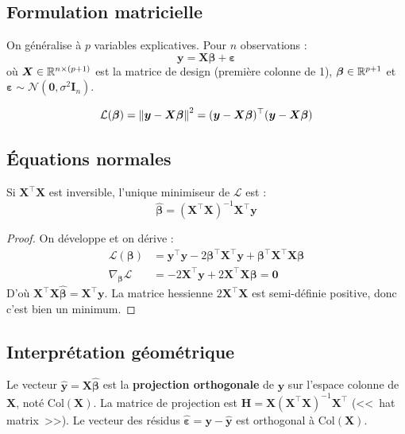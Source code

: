 \subsection{Formulation matricielle}

On g\'en\'eralise \`a $p$ variables explicatives. Pour $n$ observations :
\[
  \bm{y} = \bm{X}\bm{\beta} + \bm{\varepsilon}
\]
o\`u $\bm{X} \in \mathbb{R}^{n \times (p+1)}$ est la matrice de design (premi\`ere colonne de 1),
$\bm{\beta} \in \mathbb{R}^{p+1}$ et $\bm{\varepsilon} \sim \mathcal{N}(\bm{0}, \sigma^2 \bm{I}_n)$.

\begin{definition}
\[
  \mathcal{L}(\bm{\beta}) = \left\| \bm{y} - \bm{X}\bm{\beta} \right\|^2
  = (\bm{y} - \bm{X}\bm{\beta})^\top (\bm{y} - \bm{X}\bm{\beta})
\]
\end{definition}

\subsection{\'Equations normales}

\begin{theoreme}
\label{thm:normal-equations}
Si $\bm{X}^\top \bm{X}$ est inversible, l'unique minimiseur de $\mathcal{L}$ est :
\[
  \hat{\bm{\beta}} = (\bm{X}^\top \bm{X})^{-1} \bm{X}^\top \bm{y}
\]
\end{theoreme}

\begin{proof}
On d\'eveloppe et on d\'erive :
\begin{align*}
  \mathcal{L}(\bm{\beta})
  &= \bm{y}^\top \bm{y} - 2\bm{\beta}^\top \bm{X}^\top \bm{y}
     + \bm{\beta}^\top \bm{X}^\top \bm{X} \bm{\beta} \\
  \nabla_{\bm{\beta}} \mathcal{L}
  &= -2\bm{X}^\top \bm{y} + 2\bm{X}^\top \bm{X}\bm{\beta} = \bm{0}
\end{align*}
D'o\`u $\bm{X}^\top \bm{X} \hat{\bm{\beta}} = \bm{X}^\top \bm{y}$. La matrice hessienne
$2\bm{X}^\top \bm{X}$ est semi-d\'efinie positive, donc c'est bien un minimum.
\end{proof}

\subsection{Interpr\'etation g\'eom\'etrique}

\begin{intuition}[title=\textbf{Projection orthogonale}]
Le vecteur $\hat{\bm{y}} = \bm{X}\hat{\bm{\beta}}$ est la \textbf{projection orthogonale}
de $\bm{y}$ sur l'espace colonne de $\bm{X}$, not\'e $\text{Col}(\bm{X})$.
La matrice de projection est $\bm{H} = \bm{X}(\bm{X}^\top \bm{X})^{-1}\bm{X}^\top$
(<<~hat matrix~>>). Le vecteur des r\'esidus $\hat{\bm{\varepsilon}} = \bm{y} - \hat{\bm{y}}$
est orthogonal \`a $\text{Col}(\bm{X})$.
\end{intuition}

